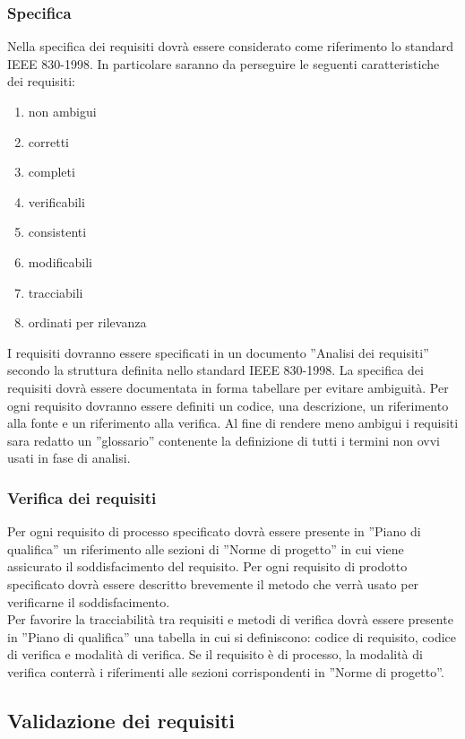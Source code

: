 {{			\subsubsection{Specifica}{
				Nella specifica dei requisiti dovrà essere considerato come riferimento lo standard IEEE 830-1998. In particolare saranno da perseguire le seguenti caratteristiche dei requisiti:
				\begin{enumerate}
					\item non ambigui
					\item corretti
					\item completi
					\item verificabili
					\item consistenti
					\item modificabili
					\item tracciabili
					\item ordinati per rilevanza
				\end{enumerate}
				I requisiti dovranno essere specificati in un documento ”Analisi dei requisiti” secondo la struttura definita nello standard IEEE 830-1998. La specifica dei requisiti dovrà essere documentata in forma tabellare per evitare ambiguità. Per ogni requisito dovranno essere definiti un codice, una descrizione, un riferimento alla fonte e un riferimento alla verifica. Al fine di rendere meno ambigui i requisiti sara redatto un ”glossario” contenente la definizione di tutti i termini non ovvi usati in fase di analisi.
			}
			\subsubsection{Verifica dei requisiti}{
				Per ogni requisito di processo specificato dovrà essere presente in ”Piano di qualifica” un riferimento alle sezioni di ”Norme di progetto” in cui viene assicurato il soddisfacimento del requisito. Per ogni requisito di prodotto specificato dovrà essere descritto brevemente il metodo che verrà usato per verificarne il soddisfacimento.\\Per favorire la tracciabilità tra requisiti e metodi di verifica dovrà essere presente in ”Piano di qualifica” una tabella in cui si definiscono: codice di requisito, codice di verifica e modalità di verifica. Se il requisito è di processo, la modalità di verifica conterrà i riferimenti alle sezioni corrispondenti in ”Norme di progetto”.
			}
		}
		\subsection{Validazione dei requisiti}{
}}
